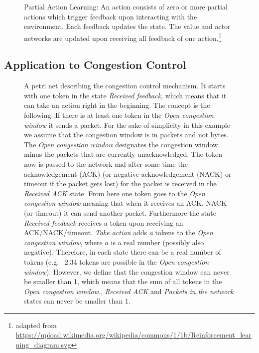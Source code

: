 \documentclass[newfonts=false,format=sigconf,10pt,letterpaper]{acmart}
\begin{document}
%

\begin{figure}
\begin{minipage}{\columnwidth}
%

\caption{Partial Action Learning: An action consists of zero or more partial actions which trigger feedback upon interacting with the environment. Each feedback updates the state. The value and actor networks are updated upon receiving all feedback of one action.\protect\footnote{adapted from \url{https://upload.wikimedia.org/wikipedia/commons/1/1b/Reinforcement_learning_diagram.svg}}}
\label{fig:pal}
\end{minipage}
\end{figure}

\subsection{Application to Congestion Control}

\begin{figure}



\caption{A petri net describing the congestion control mechanism. It starts with one token in the state \textit{Received feedback}, which means that it can take an action right in the beginning. The concept is the following: If there is at least one token in the \textit{Open congestion window} it sends a packet. For the sake of simplicity in this example we assume that the congestion window is in packets and not bytes. The \textit{Open congestion window} designates the congestion window minus the packets that are currently unacknowledged. The token now is passed to the network and after some time the acknowledgement (ACK) (or negative-acknowledgement (NACK) or timeout if the packet gets lost) for the packet is received in the \textit{Received ACK} state. From here one token goes to the \textit{Open congestion window} meaning that when it receives an ACK, NACK (or timeout) it can send another packet. Furthermore the state \textit{Received feedback} receives a token upon receiving an ACK/NACK/timeout. \textit{Take action} adds \textit{a} tokens to the \textit{Open congestion window}, where $a$ is a real number (possibly also negative). Therefore, in each state there can be a real number of tokens (e.g.~ 2.34 tokens are possible in the \textit{Open congestion window}). However, we define that the congestion window can never be smaller than 1, which means that the sum of all tokens in the \textit{Open congestion window.}, \textit{Received ACK} and \textit{Packets in the network} states can never be smaller than 1.}
\label{fig:petri}
\end{figure}
\end{document}
